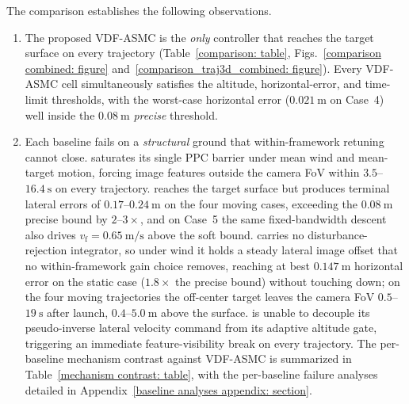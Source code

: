 \documentclass{IEEEtaes}
\begin{document}
The comparison establishes the following observations.
\begin{enumerate}
    \item The proposed VDF-ASMC is the \emph{only} controller that reaches the target surface on every trajectory (Table~\ref{comparison: table}, Figs.~\ref{comparison combined: figure} and~\ref{comparison_traj3d_combined: figure}). Every VDF-ASMC cell simultaneously satisfies the altitude, horizontal-error, and time-limit thresholds, with the worst-case horizontal error ($0.021~\text{m}$ on Case~4) well inside the $0.08~\text{m}$ \emph{precise} threshold.
    \item Each baseline fails on a \emph{structural} ground that within-framework retuning cannot close. \cite{lin2022} saturates its single PPC barrier under mean wind and mean-target motion, forcing image features outside the camera FoV within $3.5$--$16.4~\text{s}$ on every trajectory. \cite{zhang2026} reaches the target surface but produces terminal lateral errors of $0.17$--$0.24~\text{m}$ on the four moving cases, exceeding the $0.08~\text{m}$ precise bound by $2$--$3\times$, and on Case~5 the same fixed-bandwidth descent also drives $v_\text{f}=0.65~\text{m/s}$ above the soft bound. \cite{lin2023} carries no disturbance-rejection integrator, so under wind it holds a steady lateral image offset that no within-framework gain choice removes, reaching at best $0.147~\text{m}$ horizontal error on the static case ($1.8\times$ the precise bound) without touching down; on the four moving trajectories the off-center target leaves the camera FoV $0.5$--$19~\text{s}$ after launch, $0.4$--$5.0~\text{m}$ above the surface. \cite{cho2022} is unable to decouple its pseudo-inverse lateral velocity command from its adaptive altitude gate, triggering an immediate feature-visibility break on every trajectory. The per-baseline mechanism contrast against VDF-ASMC is summarized in Table~\ref{mechanism contrast: table}, with the per-baseline failure analyses detailed in Appendix~\ref{baseline analyses appendix: section}.


\end{enumerate}
\end{document}
